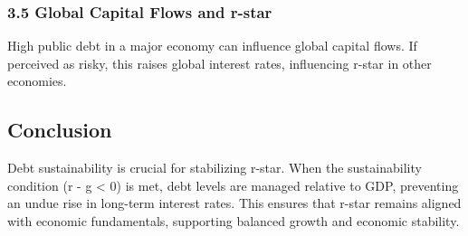 \documentclass[
  letterpaper,
  DIV=11,
  numbers=noendperiod]{scrartcl}
\begin{document}
\subsubsection{3.5 Global Capital Flows and
r-star}\label{global-capital-flows-and-r-star}

High public debt in a major economy can influence global capital flows.
If perceived as risky, this raises global interest rates, influencing
r-star in other economies.

\subsection{Conclusion}\label{conclusion}

Debt sustainability is crucial for stabilizing r-star. When the
sustainability condition (r - g \textless{} 0) is met, debt levels are
managed relative to GDP, preventing an undue rise in long-term interest
rates. This ensures that r-star remains aligned with economic
fundamentals, supporting balanced growth and economic stability.
\end{document}
